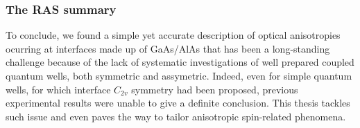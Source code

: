 \subsubsection{The RAS summary}
\label{subsubsec:chapter-3-ras-conclusions}
\vspace{-10mm}
To conclude, we found a simple yet accurate description of optical anisotropies ocurring at interfaces made up of GaAs/AlAs that has been a long-standing challenge because of the
lack of systematic investigations of well prepared coupled quantum wells, both symmetric and assymetric. Indeed, even
for simple quantum wells, for which interface $C_{2v}$ symmetry had been proposed, previous
experimental results were unable to give a definite conclusion. This thesis tackles such
issue and even paves the way to tailor anisotropic spin-related phenomena.







